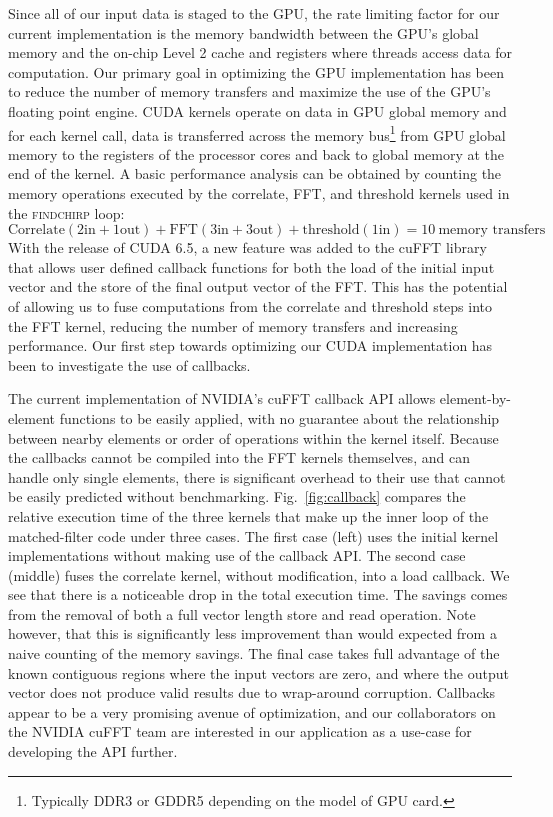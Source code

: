 Since all of our input data is staged to the GPU, the rate limiting factor for
our current implementation is the memory bandwidth between the GPU's global
memory and the on-chip Level 2 cache and registers where threads access data
for computation.  Our primary goal in optimizing the GPU implementation has
been to reduce the number of memory transfers and maximize the use of the
GPU's floating point engine.  CUDA kernels operate on data in GPU global
memory and for each kernel call, data is transferred across the memory
bus\footnote{Typically DDR3 or GDDR5 depending on the model of GPU card.} from
GPU global memory to the registers of the processor cores and back to global
memory at the end of the kernel.  A basic performance analysis can be obtained by
counting the memory operations executed by the correlate, FFT, and threshold
kernels used in the \textsc{findchirp} loop:
\begin{equation}
\textrm{Correlate} (2 \textrm{in}+1 \textrm{out}) + \textrm{FFT} (3 \textrm{in}+3 \textrm{out}) + \textrm{threshold} (1 \textrm{in})  = 10 \ \textrm{memory transfers}
\end{equation}
With the release of CUDA 6.5, a new feature was added to the cuFFT
library that allows user defined callback functions for both the load of the
initial input vector and the store of the final output vector of the FFT.
This has the potential of allowing us to fuse computations from the correlate
and threshold steps into the FFT kernel, reducing the number of memory
transfers and increasing performance. Our first step towards optimizing our
CUDA implementation has been to investigate the use of callbacks.

The current implementation of NVIDIA's cuFFT callback API allows
element-by-element functions to be easily applied, with no guarantee about the
relationship between nearby elements or order of operations within the kernel
itself. Because the callbacks cannot be compiled into the FFT kernels
themselves, and can handle only single elements, there is significant overhead
to their use that cannot be easily predicted without benchmarking.
Fig.~\ref{fig:callback} compares the relative execution time of the three
kernels that make up the inner loop of the matched-filter code under three
cases. The first case (left) uses the initial kernel implementations without
making use of the callback API. The second case (middle) fuses the correlate
kernel, without modification, into a load callback. We see that there is a
noticeable drop in the total execution time. The savings comes from the
removal of both a full vector length store and read operation. Note however,
that this is significantly less improvement than would expected from a naive
counting of the memory savings. The final case takes full advantage of the
known contiguous regions where the input vectors are zero, and where the
output vector does not produce valid results due to wrap-around corruption.
Callbacks appear to be a very promising avenue of optimization, and our
collaborators on the NVIDIA cuFFT team are interested in our application as a
use-case for developing the API further.

